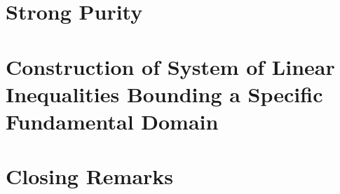 \documentclass[submission%
]{dmtcs}
\begin{document}



\section{Strong Purity}\label{purity}





\section{Construction of System of Linear Inequalities Bounding a Specific Fundamental Domain}\label{system}





\section{Closing Remarks}\label{closing}



\nocite{*}

%

\label{sec:biblio}
\end{document}
